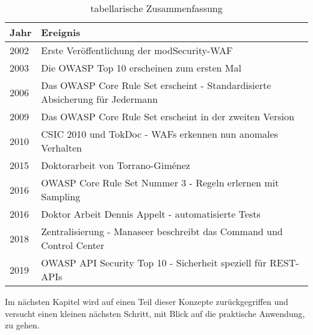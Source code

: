 \begin{table}[h]
    \centering
 
\begin{tabular}{lp{9cm}}
  \toprule
  Jahr & Ereignis\\
  \midrule
  2002 & Erste Veröffentlichung der modSecurity-WAF \\
  2003 & Die OWASP Top 10 erscheinen zum ersten Mal\\
  2006 & Das OWASP Core Rule Set erscheint - Standardisierte Absicherung für Jedermann \\
  2009 & Das OWASP Core Rule Set erscheint in der zweiten Version \\
  2010 & CSIC 2010 und TokDoc - WAFs erkennen nun anomales Verhalten \\
  2015 & Doktorarbeit von Torrano-Giménez \\
  2016 & OWASP Core Rule Set Nummer 3 - Regeln erlernen mit Sampling \\
  2016 & Doktor Arbeit Dennis Appelt - automatisierte Tests \\
  2018 & Zentralisierung - Manaseer beschreibt das Command und Control Center\\
  2019 & OWASP API Security Top 10 - Sicherheit speziell für REST-APIs\\
  \bottomrule
\end{tabular}
\caption{tabellarische Zusammenfassung}
\label{tab:zeitstrahl}
\end{table}

Im nächsten Kapitel wird auf einen Teil dieser Konzepte zurückgegriffen und versucht einen kleinen nächsten Schritt, mit Blick auf die praktische Anwendung, zu gehen.

